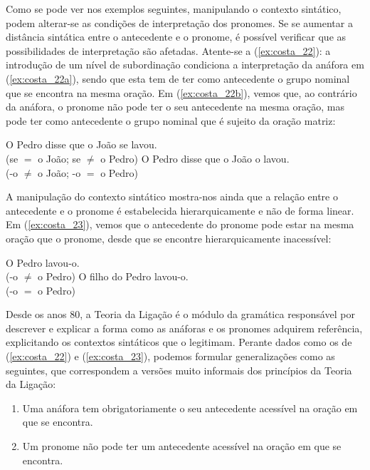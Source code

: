 \documentclass[output=paper]{LSP/langsci}
\begin{document}
Como se pode ver nos exemplos seguintes, manipulando o contexto sintático, podem alterar-se as condições de interpretação dos pronomes. Se se aumentar a distância sintática entre o antecedente e o pronome, é possível verificar que as possibilidades de interpretação são afetadas. Atente-se a (\ref{ex:costa_22}): a introdução de um nível de subordinação condiciona a interpretação da anáfora em (\ref{ex:costa_22a}), sendo que esta tem de ter como antecedente o grupo nominal que se encontra na mesma oração. Em (\ref{ex:costa_22b}), vemos que, ao contrário da anáfora, o pronome não pode ter o seu antecedente na mesma oração, mas pode ter como antecedente o grupo nominal que é sujeito da oração matriz:

\ea\label{ex:costa_22}
\ea\label{ex:costa_22a} O Pedro disse que o João se lavou.\\(se $=$ o João; se $\neq$ o Pedro)
\ex\label{ex:costa_22b} O Pedro disse que o João o lavou.\\(-o $\neq$ o João; -o $=$ o Pedro)
\zl

A manipulação do contexto sintático mostra-nos ainda que a relação entre o antecedente e o pronome é estabelecida hierarquicamente e não de forma linear. Em (\ref{ex:costa_23}), vemos que o antecedente do pronome pode estar na mesma oração que o pronome, desde que se encontre hierarquicamente inacessível:

\ea\label{ex:costa_23}
\ea\label{ex:costa_23a} O Pedro lavou-o.\\(-o $\neq$ o Pedro)
\ex\label{ex:costa_23b} O filho do Pedro lavou-o.\\(-o $=$ o Pedro)
\zl

Desde os anos 80, a Teoria da Ligação é o módulo da gramática responsável por descrever e explicar a forma como as anáforas e os pronomes adquirem referência, explicitando os contextos sintáticos que o legitimam. Perante dados como os de (\ref{ex:costa_22}) e (\ref{ex:costa_23}), podemos formular generalizações como as seguintes, que correspondem a versões muito informais dos princípios da Teoria da Ligação:

\begin{enumerate}[label=\Alph*.]
\item  Uma anáfora tem obrigatoriamente o seu antecedente acessível na oração em que se encontra.
\item  Um pronome não pode ter um antecedente acessível na oração em que se encontra.
\end{enumerate}
\end{document}
